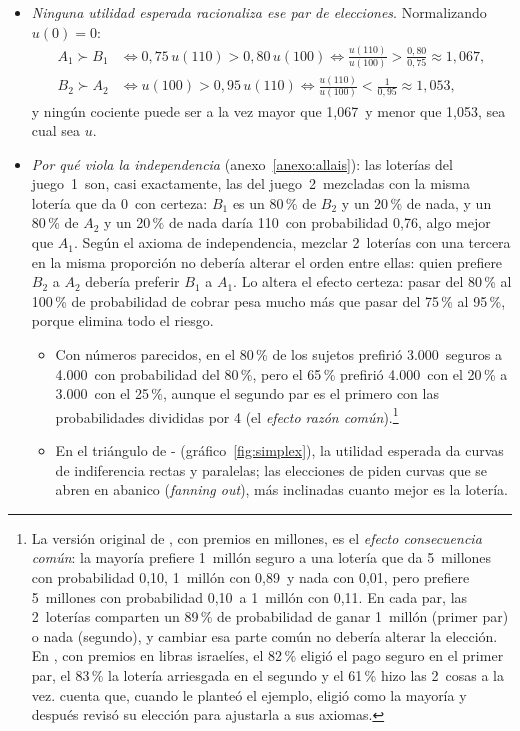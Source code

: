 \documentclass[11pt]{article}
\begin{document}
\begin{itemize}
\item \emph{Ninguna utilidad esperada racionaliza ese par de elecciones}. Normalizando $u(0)=0$:
  \begin{align*}
  A_1\succ B_1&\iff 0{,}75\,u(110)>0{,}80\,u(100)\iff\frac{u(110)}{u(100)}>\frac{0{,}80}{0{,}75}\approx 1{,}067,\\
  B_2\succ A_2&\iff u(100)>0{,}95\,u(110)\iff\frac{u(110)}{u(100)}<\frac{1}{0{,}95}\approx 1{,}053 ,
  \end{align*}
  y ningún cociente puede ser a la vez mayor que 1,067~y menor que 1,053, sea cual sea $u$.
\item \emph{Por qué viola la independencia} (anexo~\ref{anexo:allais}): las loterías del juego~1~son, casi exactamente, las del juego~2~mezcladas con la misma lotería que da 0~con certeza: $B_1$ es un 80\,\% de $B_2$ y un 20\,\% de nada, y un 80\,\% de $A_2$ y un 20\,\% de nada daría 110~con probabilidad 0,76, algo mejor que $A_1$. Según el axioma de independencia, mezclar 2~loterías con una tercera en la misma proporción no debería alterar el orden entre ellas: quien prefiere $B_2$ a $A_2$ debería preferir $B_1$ a $A_1$. Lo altera el efecto certeza: pasar del 80\,\% al 100\,\% de probabilidad de cobrar pesa mucho más que pasar del 75\,\% al 95\,\%, porque elimina todo el riesgo.
  \begin{itemize}
  \item Con números parecidos, en \textcite[problemas~3 y~4]{KahnemanTversky1979Prospect} el 80\,\% de los sujetos prefirió 3.000~seguros a 4.000~con probabilidad del 80\,\%, pero el 65\,\% prefirió 4.000~con el 20\,\% a 3.000~con el 25\,\%, aunque el segundo par es el primero con las probabilidades divididas por 4 (el \emph{efecto razón común}).\footnote{La versión original de , con premios en millones, es el \emph{efecto consecuencia común}: la mayoría prefiere 1~millón seguro a una lotería que da 5~millones con probabilidad 0,10, 1~millón con 0,89~y nada con 0,01, pero prefiere 5~millones con probabilidad 0,10~a 1~millón con 0,11. En cada par, las 2~loterías comparten un 89\,\% de probabilidad de ganar 1~millón (primer par) o nada (segundo), y cambiar esa parte común no debería alterar la elección. En \textcite{KahnemanTversky1979Prospect}, con premios en libras israelíes, el 82\,\% eligió el pago seguro en el primer par, el 83\,\% la lotería arriesgada en el segundo y el 61\,\% hizo las 2~cosas a la vez.  cuenta que, cuando  le planteó el ejemplo, eligió como la mayoría y después revisó su elección para ajustarla a sus axiomas\nocite{Savage1954Foundations}.}
  \item En el triángulo de - (gráfico~\ref{fig:simplex}), la utilidad esperada da curvas de indiferencia rectas y paralelas; las elecciones de  piden curvas que se abren en abanico (\emph{fanning out}), más inclinadas cuanto mejor es la lotería\nocite{Machina1982Expected}.
  \end{itemize}
\end{itemize}
\end{document}
